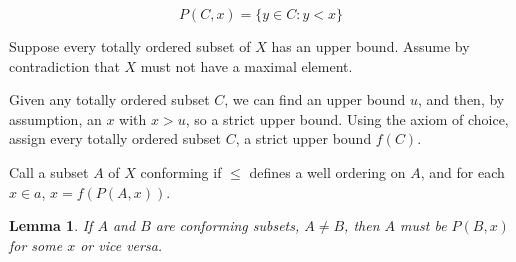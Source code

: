 \documentclass{article}
\newtheorem*{lemma}{Lemma}
\begin{document}
        \[P(C,x) = \{y \in C: y < x\}\]

        Suppose every totally ordered subset of $X$ has an upper bound. Assume
        by contradiction that $X$ must not have a maximal element.

        Given any totally ordered subset $C$, we can find an upper bound $u$,
        and then, by assumption, an $x$ with $x>u$, so a strict upper bound.
        Using the axiom of choice, assign every totally ordered subset $C$, a
        strict upper bound $f(C)$.

        Call a subset $A$ of $X$ conforming if $\leq$ defines a well ordering on
        $A$, and for each $x \in a$, $x = f(P(A,x))$.

        \begin{lemma}
        If $A$ and $B$ are conforming subsets, $A \neq B$, then $A$ must
        be $P(B,x)$ for some $x$ or vice versa.
        \end{lemma}
\end{document}
